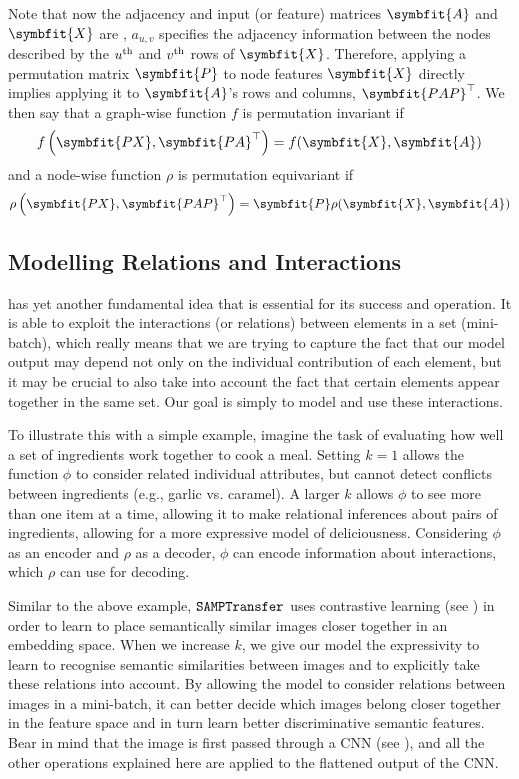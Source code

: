 Note that now the adjacency and input (or feature) matrices $\symbfit{A}$ and $\symbfit{X}$ are , $a_{u, v}$
specifies the adjacency information between the nodes described by the $u\textsuperscript{th}$ and $v\textsuperscript{th}$
rows of $\symbfit{X}$. Therefore, applying a permutation matrix $\symbfit{P}$ to node features $\symbfit{X}$ directly implies applying it to $\symbfit{A}$'s rows and columns, $\symbfit{PAP}^\top$. We then say that a graph-wise function $f$ is permutation invariant if 
\begin{equation}
    f\left(\symbfit{P X}, \symbfit{P A}^{\top}\right)=f(\symbfit{X}, \symbfit{A})
\end{equation}
and a node-wise function $\rho$ is permutation equivariant if
\begin{equation}
    \rho\left(\symbfit{P X}, \symbfit{P A P}^{\top}\right)=\symbfit{P}\rho(\symbfit{X}, \symbfit{A})
\end{equation}

\subsection{Modelling Relations and Interactions}\label{ssec:relation-and-interactions}

\samptr{} has yet another fundamental idea that is essential for its success and operation. 
It is able to exploit the interactions (or relations) between elements in a set (mini-batch), which really means that we are trying to capture the fact that our model output may depend not only on the individual contribution of each element, but it may be crucial to also take into account the fact that certain elements appear together in the same set. Our goal is simply to model and use these interactions.

To illustrate this with a simple example, imagine the task of evaluating how well a set of ingredients work together to cook a meal. Setting $k=1$ allows the function $\phi$ to consider related individual attributes, but cannot detect conflicts between ingredients (e.g., garlic vs. caramel). A larger $k$ allows $\phi$ to see more than one item at a time, allowing it to make relational inferences about pairs of ingredients, allowing for a more expressive model of deliciousness. Considering $\phi$ as an encoder and $\rho$ as a decoder, $\phi$ can encode information about interactions, which $\rho$ can use for decoding.

Similar to the above example, $\texttt{SAMPTransfer}$ uses contrastive learning (see ) in order to learn to place semantically similar images closer together in an embedding space. When we increase $k$, we give our model the expressivity to learn to recognise semantic similarities between images and to explicitly take these relations into account. By allowing the model to consider relations between images in a mini-batch, it can better decide which images belong closer together in the feature space and in turn learn better discriminative semantic features. Bear in mind that the image is first passed through a CNN (see ), and all the other operations explained here are applied to the flattened output of the CNN.


